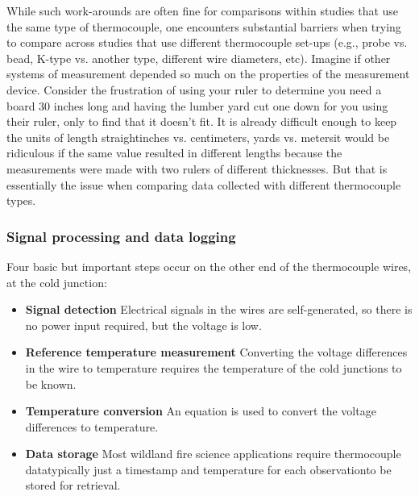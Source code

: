 While such work-arounds are often fine for comparisons within studies that use the same type of thermocouple, one encounters substantial barriers when trying to compare across studies that use different thermocouple set-ups (e.g., probe vs. bead, K-type vs. another type, different wire diameters, etc).
Imagine if other systems of measurement depended so much on the properties of the measurement device. 
Consider the frustration of using your ruler to determine you need a board 30 inches long and having the lumber yard cut one down for you using their ruler, only to find that it doesn't fit. 
It is already difficult enough to keep the units of length straight\textemdash inches vs. centimeters, yards vs. meters\textemdash it would be ridiculous if the same value resulted in different lengths because the measurements were made with two rulers of different thicknesses. 
But that is essentially the issue when comparing data collected with different thermocouple types.

\subsubsection{Signal processing and data logging}

Four basic but important steps occur on the other end of the thermocouple wires, at the cold junction: 
 \begin{itemize}[noitemsep]
	\item \textbf{Signal detection} Electrical signals in the wires are self-generated, so there is no power input required, but the voltage is low.
	\item \textbf{Reference temperature measurement} Converting the voltage differences in the wire to temperature requires the temperature of the cold junctions to be known. 
	\item \textbf{Temperature conversion} An equation is used to convert the voltage differences to temperature. 
	\item \textbf{Data storage} Most wildland fire science applications require thermocouple data\textemdash typically just a timestamp and temperature for each observation\textemdash to be stored for retrieval. 
\end{itemize}

